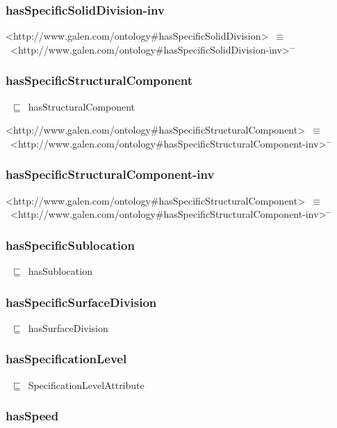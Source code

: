 \documentclass{article}
\begin{document}
\subsubsection*{hasSpecificSolidDivision-inv}

<http://www.galen.com/ontology#hasSpecificSolidDivision>~\ensuremath{\equiv}~<http://www.galen.com/ontology#hasSpecificSolidDivision-inv>\ensuremath{^-}

\subsubsection*{hasSpecificStructuralComponent}

~\ensuremath{\sqsubseteq}~hasStructuralComponent

<http://www.galen.com/ontology#hasSpecificStructuralComponent>~\ensuremath{\equiv}~<http://www.galen.com/ontology#hasSpecificStructuralComponent-inv>\ensuremath{^-}

\subsubsection*{hasSpecificStructuralComponent-inv}

<http://www.galen.com/ontology#hasSpecificStructuralComponent>~\ensuremath{\equiv}~<http://www.galen.com/ontology#hasSpecificStructuralComponent-inv>\ensuremath{^-}

\subsubsection*{hasSpecificSublocation}

~\ensuremath{\sqsubseteq}~hasSublocation

\subsubsection*{hasSpecificSurfaceDivision}

~\ensuremath{\sqsubseteq}~hasSurfaceDivision

\subsubsection*{hasSpecificationLevel}

~\ensuremath{\sqsubseteq}~SpecificationLevelAttribute

\subsubsection*{hasSpeed}
\end{document}
